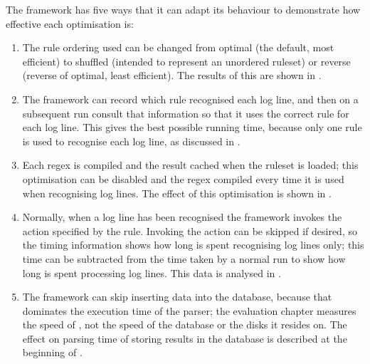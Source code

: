 The framework has five ways that it can adapt its behaviour to demonstrate
how effective each optimisation is:

\begin{enumerate}

    \item The rule ordering used can be changed from optimal (the default,
        most efficient) to shuffled (intended to represent an unordered
        ruleset) or reverse (reverse of optimal, least efficient).  The
        results of this are shown in .

    \item The framework can record which rule recognised each log line, and
        then on a subsequent run consult that information so that it uses
        the correct rule for each log line.  This gives the best possible
        running time, because only one rule is used to recognise each log
        line, as discussed in .

    \item Each regex is compiled and the result cached when the ruleset is
        loaded; this optimisation can be disabled and the regex compiled
        every time it is used when recognising log lines.  The effect of
        this optimisation is shown in .

    \item Normally, when a log line has been recognised the framework
        invokes the action specified by the rule.  Invoking the action can
        be skipped if desired, so the timing information shows how long is
        spent recognising log lines only; this time can be subtracted from
        the time taken by a normal run to show how long is spent processing
        log lines.  This data is analysed in .

    \item The framework can skip inserting data into the database, because
        that dominates the execution time of the parser; the evaluation
        chapter measures the speed of \parsername{}, not the speed of the
        database or the disks it resides on.  The effect on parsing time of
        storing results in the database is described at the beginning of
        .

\end{enumerate}

